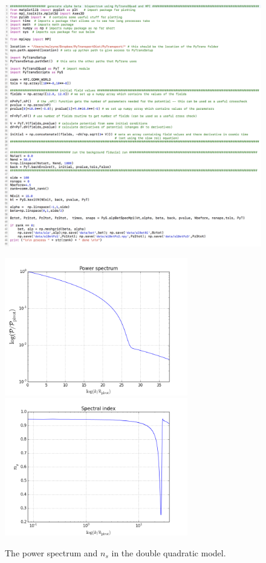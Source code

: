 \documentclass[10pt,
amsmath,amssymb,
aps,prd,nofootinbib,eqsecnum,a4paper]{revtex4}
\begin{document}
\begin{figure}[H]
\centering
\includegraphics[width=18cm]{shot8b}
\end{figure}

\begin{figure}
\centering
\includegraphics[width=8cm]{Pz}\includegraphics[width=8cm]{ns}
\caption{The power spectrum and $n_s$ in the double quadratic model. \label{power}}
\end{figure}
\end{document}
